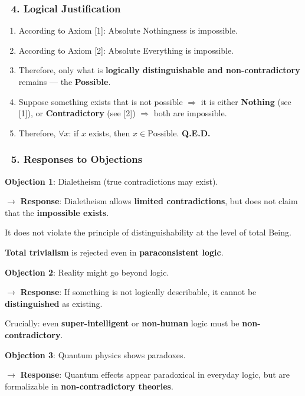 \documentclass[12pt]{article}
\begin{document}
\subsubsection*{🔹 4. Logical Justification}
\begin{enumerate}
\item According to Axiom [1]: Absolute Nothingness is impossible.
\item According to Axiom [2]: Absolute Everything is impossible.
\item Therefore, only what is \textbf{logically distinguishable and non-contradictory} remains — the \textbf{Possible}.
\item Suppose something exists that is not possible 
$\Rightarrow$ 
it is either \textbf{Nothing} (see [1]), or \textbf{Contradictory} (see [2]) 
$\Rightarrow$ both are impossible.
\item Therefore, $\forall x$: if $x$ exists, then $x \in \text{Possible}$. \textbf{Q.E.D.}
\end{enumerate}

\subsubsection*{🔹 5. Responses to Objections}
\textbf{Objection 1}: Dialetheism (true contradictions may exist).

$\rightarrow$ \textbf{Response}: Dialetheism allows \textbf{limited contradictions}, but does not claim that the \textbf{impossible exists}.

It does not violate the principle of distinguishability at the level of total Being.

\textbf{Total trivialism} is rejected even in \textbf{paraconsistent logic}.

\bigskip

\textbf{Objection 2}: Reality might go beyond logic.

$\rightarrow$ \textbf{Response}: If something is not logically describable, it cannot be \textbf{distinguished} as existing.

Crucially: even \textbf{super-intelligent} or \textbf{non-human} logic must be \textbf{non-contradictory}.

\bigskip

\textbf{Objection 3}: Quantum physics shows paradoxes.

$\rightarrow$ \textbf{Response}: Quantum effects appear paradoxical in everyday logic, but are formalizable in \textbf{non-contradictory theories}.
\end{document}
